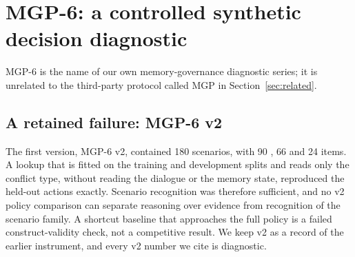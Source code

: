 \section{MGP-6: a controlled synthetic decision diagnostic}
\label{sec:mgp6}
MGP-6 is the name of our own memory-governance diagnostic series; it is unrelated to the third-party protocol called MGP in Section~\ref{sec:related}.
\subsection{A retained failure: MGP-6 v2}
The first version, MGP-6 v2, contained 180 scenarios, with 90 \supersede, 66 \abstain{} and 24 \keep{} items. A lookup that is fitted on the training and development splits and reads only the conflict type, without reading the dialogue or the memory state, reproduced the held-out actions exactly. Scenario recognition was therefore sufficient, and no v2 policy comparison can separate reasoning over evidence from recognition of the scenario family. A shortcut baseline that approaches the full policy is a failed construct-validity check, not a competitive result. We keep v2 as a record of the earlier instrument, and every v2 number we cite is diagnostic.

